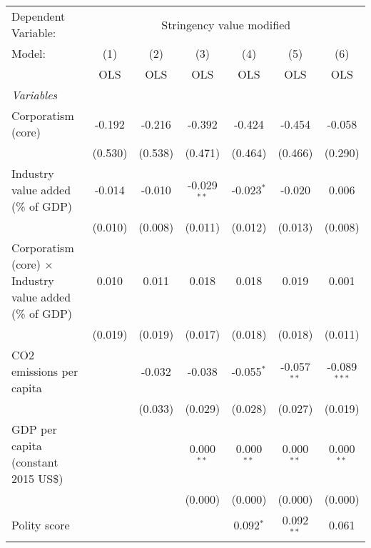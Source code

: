 
\begingroup
\centering
\begin{tabular}{lcccccc}
   \toprule
   Dependent Variable: & \multicolumn{6}{c}{Stringency value modified}\\
   Model:                                                         & (1)     & (2)     & (3)           & (4)          & (5)           & (6)\\  
                                                                  &  OLS    & OLS     & OLS           & OLS          & OLS           & OLS\\  
   \midrule
   \emph{Variables}\\
   Corporatism (core)                                             & -0.192  & -0.216  & -0.392        & -0.424       & -0.454        & -0.058\\   
                                                                  & (0.530) & (0.538) & (0.471)       & (0.464)      & (0.466)       & (0.290)\\   
   Industry value added (\% of GDP)                               & -0.014  & -0.010  & -0.029$^{**}$ & -0.023$^{*}$ & -0.020        & 0.006\\   
                                                                  & (0.010) & (0.008) & (0.011)       & (0.012)      & (0.013)       & (0.008)\\   
   Corporatism (core) $\times$ Industry value added (\% of GDP)   & 0.010   & 0.011   & 0.018         & 0.018        & 0.019         & 0.001\\   
                                                                  & (0.019) & (0.019) & (0.017)       & (0.018)      & (0.018)       & (0.011)\\   
   CO2 emissions per capita                                       &         & -0.032  & -0.038        & -0.055$^{*}$ & -0.057$^{**}$ & -0.089$^{***}$\\   
                                                                  &         & (0.033) & (0.029)       & (0.028)      & (0.027)       & (0.019)\\   
   GDP per capita (constant 2015 US\$)                            &         &         & 0.000$^{**}$  & 0.000$^{**}$ & 0.000$^{**}$  & 0.000$^{**}$\\   
                                                                  &         &         & (0.000)       & (0.000)      & (0.000)       & (0.000)\\   
   Polity score                                                   &         &         &               & 0.092$^{*}$  & 0.092$^{**}$  & 0.061\\   

\end{tabular}
